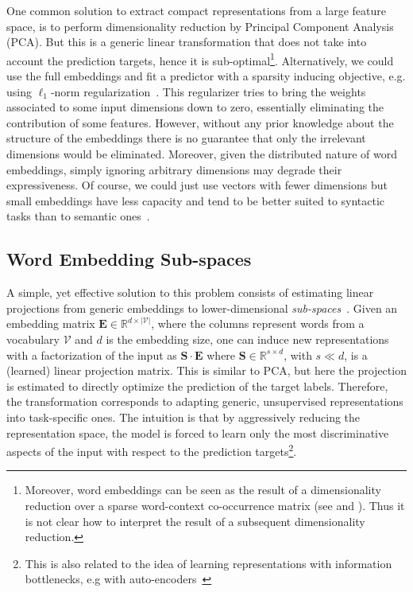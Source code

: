 \documentclass[letterpaper]{article}
\begin{document}

One common solution to extract compact representations from a large feature space, is to perform dimensionality reduction by Principal Component Analysis (PCA). But this is a generic linear transformation that does not take into account the prediction targets, hence it is sub-optimal\footnote{Moreover, word embeddings can be seen as the result of a dimensionality reduction over a sparse word-context co-occurrence matrix (see \cite{Baroni14Dont} and \cite{pennington2014glove}). Thus it is not clear how to interpret the result of a subsequent dimensionality reduction.}. Alternatively, we could use the full embeddings and fit a predictor with a sparsity inducing objective, e.g. using $\ell_1$-norm regularization~\cite{tibshirani1996regression}. This regularizer tries to bring the weights associated to some input dimensions down to zero, essentially eliminating the contribution of some features. However, without any prior knowledge about the structure of the embeddings there is no guarantee that only the irrelevant dimensions would be eliminated. Moreover, given the distributed nature of word embeddings, simply ignoring arbitrary dimensions may degrade their expressiveness. Of course, we could just use vectors with fewer dimensions but small embeddings have less capacity and tend to be better suited to syntactic tasks than to semantic ones~\cite{ling-EtAl:2015:EMNLP2}. 

\subsection{Word Embedding Sub-spaces}

A simple, yet effective solution to this problem consists of estimating linear projections from generic embeddings to lower-dimensional \textit{sub-spaces}~\cite{astudillo-EtAl:2015:ACL-IJCNLP}. Given an embedding matrix $\mathbf{E} \in \mathbb{R}^{d \times |\mathcal{V}|}$, where the columns represent words from a vocabulary $\mathcal{V}$ and $d$ is the embedding size, one can induce new representations with a factorization of the input as $\mathbf{S} \cdot \mathbf{E}$ where $\mathbf{S} \in \mathbb{R}^{s \times d}$,  with $s \ll d$, is a (learned) linear projection matrix.  This is similar to PCA, but here the projection is estimated to directly optimize the prediction of the target labels. Therefore, the transformation corresponds to adapting generic, unsupervised representations into task-specific ones. The intuition is that by aggressively reducing the representation space, the model is forced to learn only the most discriminative aspects of the input with respect to the prediction targets\footnote{This is also related to the idea of learning representations with information bottlenecks, e.g with auto-encoders~\cite{hinton2006reducing}}.
\end{document}
